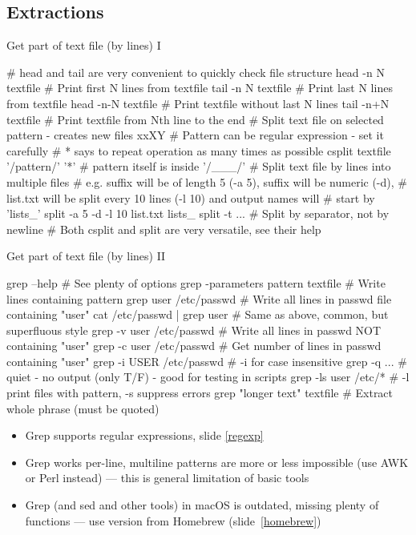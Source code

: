 \documentclass[compress, xelatex, 11pt, xcolor=svgnames, aspectratio=169, url={hyphens, lowtilde}]{beamer}
\begin{document}
\subsection{Extractions}

\begin{frame}[fragile]{Get part of text file (by lines) I}
	\begin{bashcode}
    # head and tail are very convenient to quickly check file structure
    head -n N textfile # Print first N lines from textfile
    tail -n N textfile # Print last N lines from textfile
    head -n-N textfile # Print textfile without last N lines
    tail -n+N textfile # Print textfile from Nth line to the end
    # Split text file on selected pattern - creates new files xxXY
    # Pattern can be regular expression - set it carefully
    # {*} says to repeat operation as many times as possible
    csplit textfile '/pattern/' '{*}' # pattern itself is inside '/___/'
    # Split text file by lines into multiple files
    # e.g. suffix will be of length 5 (-a 5), suffix will be numeric (-d),
    # list.txt will be split every 10 lines (-l 10) and output names will
    # start by 'lists_'
    split -a 5 -d -l 10 list.txt lists_
    split -t ... # Split by separator, not by newline
    # Both csplit and split are very versatile, see their help
	\end{bashcode}
\end{frame}

\begin{frame}[fragile]{Get part of text file (by lines) II}
	\begin{bashcode}
    grep --help # See plenty of options
    grep -parameters pattern textfile # Write lines containing pattern
    grep user /etc/passwd # Write all lines in passwd file containing "user"
    cat /etc/passwd | grep user # Same as above, common, but superfluous style
    grep -v user /etc/passwd # Write all lines in passwd NOT containing "user"
    grep -c user /etc/passwd # Get number of lines in passwd containing "user"
    grep -i USER /etc/passwd # -i for case insensitive
    grep -q ... # quiet - no output (only T/F) - good for testing in scripts
    grep -ls user /etc/* # -l print files with pattern, -s suppress errors
    grep "longer text" textfile # Extract whole phrase (must be quoted)
	\end{bashcode}
	\begin{itemize}
		\item Grep supports regular expressions, slide \ref{regexp}
		\item Grep works per-line, multiline patterns are more or less impossible (use AWK or Perl instead) --- this is general limitation of basic tools
		\item Grep (and sed and other tools) in macOS is outdated, missing plenty of functions --- use version from Homebrew (slide~\ref{homebrew})
	\end{itemize}
\end{frame}
\end{document}

